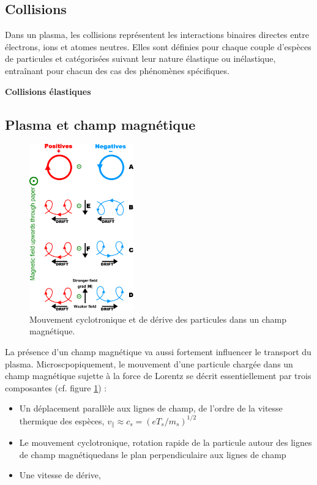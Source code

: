		\subsection{Collisions}
			Dans un plasma, les collisions représentent les interactions binaires
			directes entre électrons, ions et atomes neutres. Elles sont
			définies pour chaque couple d'espèces de particules et catégorisées suivant
			leur nature élastique ou inélastique, entraînant pour chacun des cas des
			phénomènes spécifiques.
			
			\textbf{Collisions élastiques}
			
		\subsection{Plasma et champ magnétique}
			\begin{figure}
    			\vspace{-5pt}
    			\hspace{20pt}\includegraphics[width=0.40\textwidth]{figures/particleDrifts.png}
    			\hspace{20pt}\caption{Mouvement cyclotronique et de dérive des particules
    			dans un champ magnétique.}\label{particleDrifts}
  				 \vspace{-20pt}
			\end{figure}
			La présence d'un champ magnétique va aussi fortement influencer le transport
			du plasma. Microscpopiquement, le mouvement d'une particule chargée dans un
			champ magnétique sujette à la force de Lorentz se décrit essentiellement par trois
			composantes (cf. figure \ref{particleDrifts}) :
			
			
			\begin{itemize}
			\item Un déplacement parallèle aux lignes de champ, de l'ordre de la vitesse
			thermique des espèces, $v_\parallel\approx c_s=(eT_s/m_s)^{1/2}$
			\item Le mouvement cyclotronique, rotation rapide de la particule
			autour des lignes de champ magnétiquedans le plan perpendiculaire aux lignes
			de champ
			\item Une vitesse de dérive, 
			\end{itemize}
			\
			
